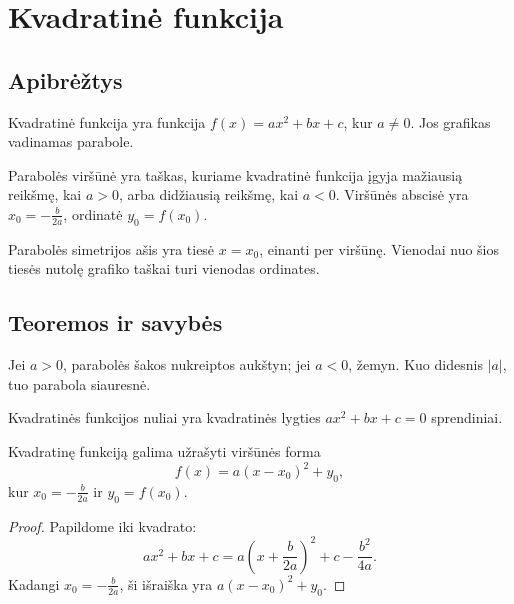 \section{Kvadratinė funkcija}\label{sec:kvadratine-funkcija}

\subsection{Apibrėžtys}

\begin{apibreztis}
Kvadratinė funkcija yra funkcija $f(x)=ax^2+bx+c$, kur $a\ne0$. Jos grafikas vadinamas parabole.
\end{apibreztis}

\begin{apibreztis}
Parabolės viršūnė yra taškas, kuriame kvadratinė funkcija įgyja mažiausią reikšmę, kai $a>0$, arba didžiausią reikšmę, kai $a<0$. Viršūnės abscisė yra $x_0=-\frac{b}{2a}$, ordinatė $y_0=f(x_0)$.
\end{apibreztis}

\begin{apibreztis}
Parabolės simetrijos ašis yra tiesė $x=x_0$, einanti per viršūnę. Vienodai nuo šios tiesės nutolę grafiko taškai turi vienodas ordinates.
\end{apibreztis}

\subsection{Teoremos ir savybės}

\begin{savybe}
Jei $a>0$, parabolės šakos nukreiptos aukštyn; jei $a<0$, žemyn. Kuo didesnis $|a|$, tuo parabola siauresnė.
\end{savybe}

\begin{savybe}
Kvadratinės funkcijos nuliai yra kvadratinės lygties $ax^2+bx+c=0$ sprendiniai.
\end{savybe}

\begin{teorema}
Kvadratinę funkciją galima užrašyti viršūnės forma
\[
f(x)=a(x-x_0)^2+y_0,
\]
kur $x_0=-\frac{b}{2a}$ ir $y_0=f(x_0)$.
\end{teorema}
\begin{proof}
Papildome iki kvadrato:
\[
ax^2+bx+c=a\left(x+\frac{b}{2a}\right)^2+c-\frac{b^2}{4a}.
\]
Kadangi $x_0=-\frac{b}{2a}$, ši išraiška yra $a(x-x_0)^2+y_0$.
\end{proof}

